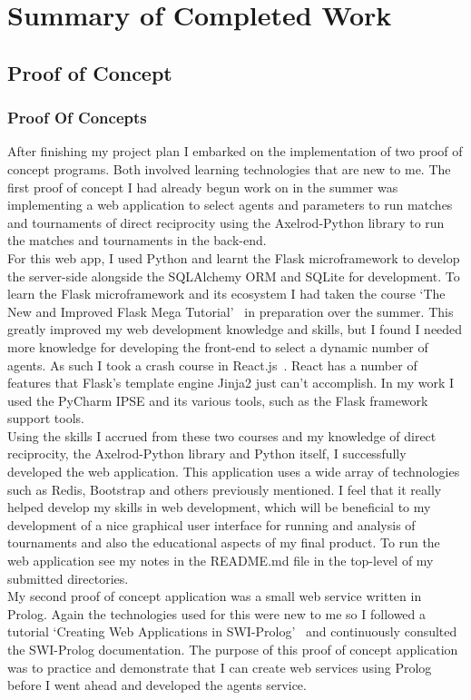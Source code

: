 \documentclass[]{final_report}
\begin{document}
\chapter{Summary of Completed Work}
\label{chapter:summary}
\section{Proof of Concept}
\subsection{Proof Of Concepts}
After finishing my project plan I embarked on the implementation of two proof of concept programs. Both involved learning technologies that are new to me. The first proof of concept I had already begun work on in the summer was implementing a web application to select agents and parameters to run matches and tournaments of direct reciprocity using the Axelrod-Python library to run the matches and tournaments in the back-end.\\
For this web app, I used Python and learnt the Flask microframework to develop the server-side alongside the SQLAlchemy ORM and SQLite for development. To learn the Flask microframework and its ecosystem I had taken the course `The New and Improved Flask Mega Tutorial'~\cite{flask_tut} in preparation over the summer. This greatly improved my web development knowledge and skills, but I found I needed more knowledge for developing the front-end to select a dynamic number of agents. As such I took a crash course in React.js~\cite{react_crash_course}. React has a number of features that Flask's template engine Jinja2 just can't accomplish. In my work I used the PyCharm IPSE and its various tools, such as the Flask framework support tools.\\
Using the skills I accrued from these two courses and my knowledge of direct reciprocity, the Axelrod-Python library and Python itself, I successfully developed the web application. This application uses a wide array of technologies such as Redis, Bootstrap and others previously mentioned. I feel that it really helped develop my skills in web development, which will be beneficial to my development of a nice graphical user interface for running and analysis of tournaments and also the educational aspects of my final product. To run the web application see my notes in the README.md file in the top-level of my submitted directories.\\
My second proof of concept application was a small web service written in Prolog. Again the technologies used for this were new to me so I followed a tutorial `Creating Web Applications in SWI-Prolog'~\cite{swi_web_tut} and continuously consulted the SWI-Prolog documentation. The purpose of this proof of concept application was to practice and demonstrate that I can create web services using Prolog before I went ahead and developed the agents service.\\
\end{document}
